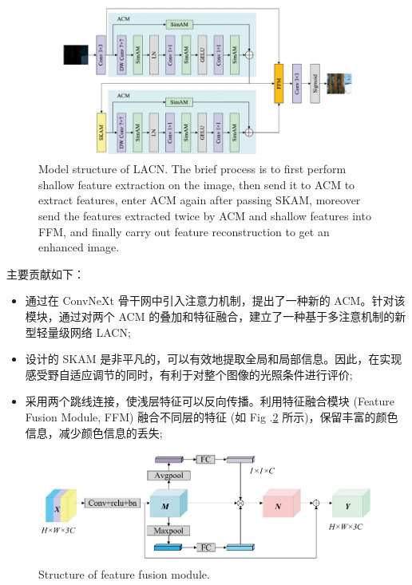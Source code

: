 \documentclass[a4paper]{ctexart}
\begin{document}
	\begin{figure}[htbp]
		\centering 
		\includegraphics[width=\columnwidth]{picture/LLIE/LACN/LACN model structure}
		\caption{
			\label{fig: LACN model structure} 
			Model structure of LACN. The brief process is to first perform shallow feature extraction on the image, then send it to ACM to extract features, enter ACM again after passing SKAM, moreover send the features extracted twice by ACM and shallow features into FFM, and finally carry out feature reconstruction to get an enhanced image.
		}
	\end{figure}
	
	主要贡献如下：
	
	\begin{itemize}
		\item[(1)] 
		通过在 ConvNeXt 骨干网中引入注意力机制，提出了一种新的 ACM。针对该模块，通过对两个 ACM 的叠加和特征融合，建立了一种基于多注意机制的新型轻量级网络 LACN;
		
		\item[(2)]
		设计的 SKAM 是非平凡的，可以有效地提取全局和局部信息。因此，在实现感受野自适应调节的同时，有利于对整个图像的光照条件进行评价;
		
		\item[(3)]
		采用两个跳线连接，使浅层特征可以反向传播。利用特征融合模块 (Feature Fusion Module, FFM) 融合不同层的特征 (如 Fig .\ref{fig: FFM structure} 所示)，保留丰富的颜色信息，减少颜色信息的丢失;
	\end{itemize}	
	
	\begin{figure}[htbp]
		\centering 
		\includegraphics[width=0.8\columnwidth]{picture/LLIE/LACN/FFM structure}
		\caption{
			\label{fig: FFM structure} 
			Structure of feature fusion module.
		}
	\end{figure}
	
\end{document}
